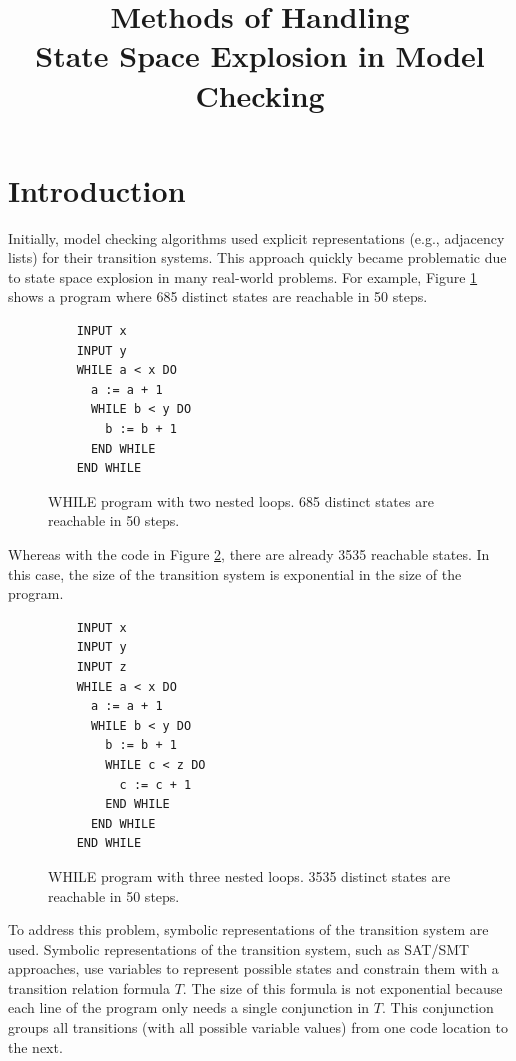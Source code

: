 \documentclass[sigconf,natbib=false]{acmart}
\begin{document}
\title{Methods of Handling\\State Space Explosion in Model Checking}


\maketitle
\section{Introduction}
Initially, model checking algorithms used explicit representations (e.g., adjacency lists) for their transition systems\cite{clarke201425}. This approach quickly became problematic due to state space explosion in many real-world problems. For example, Figure \ref{fig:2nested} shows a program where 685 distinct states are reachable in 50 steps.
\begin{figure}
    \centering
    \begin{verbatim}
    INPUT x
    INPUT y
    WHILE a < x DO
      a := a + 1
      WHILE b < y DO
        b := b + 1
      END WHILE
    END WHILE
    \end{verbatim}
    \caption{WHILE program with two nested loops. 685 distinct states are reachable in 50 steps.}
    \label{fig:2nested}
\end{figure}
Whereas with the code in Figure \ref{fig:3nested}, there are already 3535 reachable states. In this case, the size of the transition system is exponential in the size of the program.
\begin{figure}
    \centering
    \begin{verbatim}
    INPUT x
    INPUT y
    INPUT z
    WHILE a < x DO
      a := a + 1
      WHILE b < y DO
        b := b + 1
        WHILE c < z DO
          c := c + 1
        END WHILE
      END WHILE
    END WHILE
\end{verbatim}
    \caption{WHILE program with three nested loops. 3535 distinct states are reachable in 50 steps.}
    \label{fig:3nested}
\end{figure}

To address this problem, symbolic representations of the transition system are used. Symbolic representations of the transition system, such as SAT/SMT approaches, use variables to represent possible states and constrain them with a transition relation formula \( T \). The size of this formula is not exponential because each line of the program only needs a single conjunction in \( T \). This conjunction groups all transitions (with all possible variable values) from one code location to the next.
\end{document}
